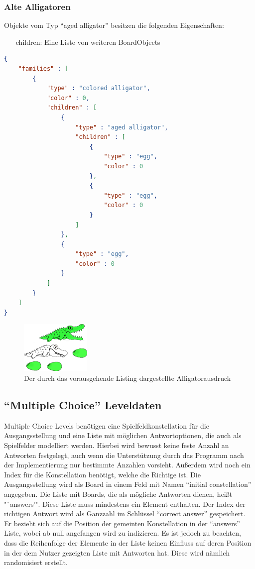 \subsubsection{Alte Alligatoren}
Objekte vom Typ "`aged alligator"' besitzen die folgenden Eigenschaften:
\begin{itemize}
	\item[children:] Eine Liste von weiteren BoardObjects
\end{itemize}

\begin{lstlisting}[language=json,caption={Ein einfaches Board mit allen existierenden BoardObjects}]
{
	"families" : [
		{
			"type" : "colored alligator",
			"color" : 0,
			"children" : [
				{
					"type" : "aged alligator",
					"children" : [
						{
							"type" : "egg",
							"color" : 0
						},
						{
							"type" : "egg",
							"color" : 0
						}
					]
				},
				{
					"type" : "egg",
					"color" : 0
				}
			]
		}
	]
}
\end{lstlisting}
	
\begin{figure}[h]
	\caption{Der durch das vorausgehende Listing dargestellte Alligatorausdruck}
	\begin{center}
		\includegraphics[width=0.3\textwidth]{../assets/lx.((x x) x).png}
	\end{center}
\end{figure}

\subsection{"`Multiple Choice"' Leveldaten}
Multiple Choice Levels benötigen eine Spielfeldkonstellation für die Ausgangsstellung und eine Liste mit möglichen Antwortoptionen, die auch als Spielfelder modelliert werden.
Hierbei wird bewusst keine feste Anzahl an Antworten festgelegt, auch wenn die Unterstützung durch das Programm nach der Implementierung nur bestimmte Anzahlen vorsieht.
Außerdem wird noch ein Index für die Konstellation benötigt, welche die Richtige ist.
Die Ausgangsstellung wird als Board in einem Feld mit Namen "`initial constellation"' angegeben.
Die Liste mit Boards, die als mögliche Antworten dienen, heißt "`answers'".
Diese Liste muss mindestens ein Element enthalten.
Der Index der richtigen Antwort wird als Ganzzahl im Schlüssel "`correct answer"' gespeichert.
Er bezieht sich auf die Position der gemeinten Konstellation in der "`answers"' Liste, wobei ab null angefangen wird zu indizieren.
Es ist jedoch zu beachten, dass die Reihenfolge der Elemente in der Liste keinen Einfluss auf deren Position in der dem Nutzer gezeigten Liste mit Antworten hat.
Diese wird nämlich randomisiert erstellt.

